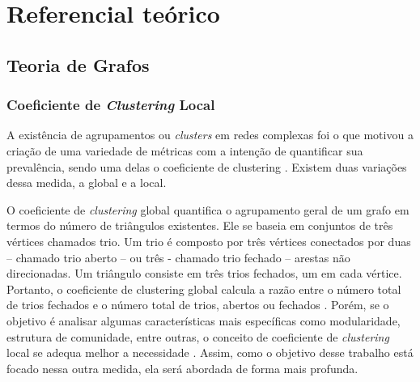 \chapter{Referencial te\'orico}\label{cap:referencialTeorico}


\section{Teoria de Grafos}\label{sec:teoria_grafos}


\subsection{Coeficiente de \textit{Clustering} Local}\label{subsec:clustering_local}

A existência de agrupamentos ou \textit{clusters} em redes complexas foi o que motivou a criação de
uma variedade de métricas com a intenção de quantificar sua prevalência, sendo uma delas o
coeficiente de clustering \cite{Barabasi69-70}. Existem duas variações dessa medida, a global e a local.

O coeficiente de \textit{clustering} global quantifica o agrupamento geral de um grafo em termos do
número de triângulos existentes. Ele se baseia em conjuntos de três vértices chamados
trio. Um trio é composto por três vértices conectados por duas – chamado trio aberto – ou três
- chamado trio fechado – arestas não direcionadas. Um triângulo consiste em três trios
fechados, um em cada vértice. Portanto, o coeficiente de clustering global calcula a razão
entre o número total de trios fechados e o número total de trios, abertos ou fechados \cite[48--49]{Barabasi69-70}. Porém, se o objetivo é analisar algumas características mais específicas como modularidade,
estrutura de comunidade, entre outras, o conceito de coeficiente de \textit{clustering} local se adequa
melhor a necessidade \cite[63]{Lima2022}. Assim, como o objetivo desse trabalho está focado nessa outra
medida, ela será abordada de forma mais profunda.

